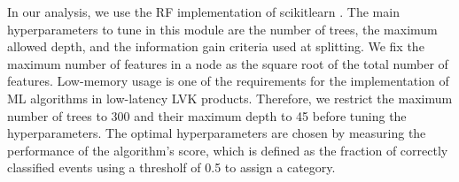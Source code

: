 In our analysis, we use the \ac{RF} implementation of scikitlearn \citep{Pedregosa:2011}. The main hyperparameters  to tune in this module are the number of trees, the maximum allowed depth, and the information gain criteria used at splitting.  We fix the maximum number of features in a node  as the square root of the total number of features. Low-memory usage is one of the requirements for the implementation of \ac{ML} algorithms in low-latency \ac{LVK} products. Therefore, we restrict the maximum number of trees to 300 and their maximum depth to 45 before tuning the hyperparameters. The optimal hyperparameters are chosen by measuring the performance of the algorithm's score, which is defined as the fraction of correctly classified events using a thresholf of 0.5 to assign a category.  


 



